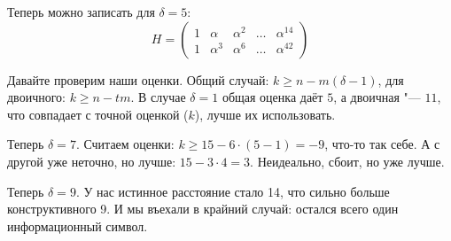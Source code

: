 Теперь можно записать для $\delta=5$:
\[
H=\begin{pmatrix}
1 & \alpha & \alpha^2 & \dots & \alpha^{14} \\
1 & \alpha^3 & \alpha^6 & \dots & \alpha^{42}
\end{pmatrix}
\]

Давайте проверим наши оценки.
Общий случай: $k \ge n - m(\delta-1)$, для двоичного: $k \ge n - tm$.
В случае $\delta=1$ общая оценка даёт $5$, а двоичная "--- $11$,
что совпадает с точной оценкой ($k$), лучше их использовать.

Теперь $\delta=7$.                          
Считаем оценки: $k \ge 15 - 6 \cdot (5-1) = -9$, что-то так себе.
А с другой уже неточно, но лучше: $15 - 3 \cdot 4=3$.
Неидеально, сбоит, но уже лучше.

Теперь $\delta=9$.
У нас истинное расстояние стало 14, что сильно больше конструктивного 9.
И мы въехали в крайний случай: остался всего один информационный символ.
